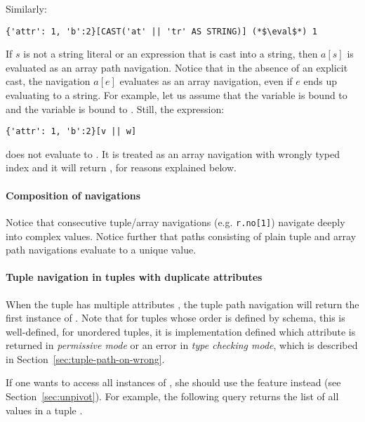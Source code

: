 \noindent Similarly:

\begin{lstlisting}
{'attr': 1, 'b':2}[CAST('at' || 'tr' AS STRING)] (*$\eval$*) 1
\end{lstlisting}

If $s$ is not a string literal or an expression that is cast into a string, then
$a[s]$ is evaluated as an array path navigation. Notice that in the absence of
an explicit cast, the navigation $a[e]$ evaluates as an array navigation, even
if $e$ ends up evaluating to a string. For example, let us assume that the
variable  is bound to  and the variable  is bound to
. Still, the expression:


\begin{lstlisting}
{'attr': 1, 'b':2}[v || w]
\end{lstlisting}

\noindent does not evaluate to . It is treated as an array navigation with
wrongly typed index and it will return , for reasons explained
below. 

\paragraph{Composition of navigations} Notice that consecutive
tuple/array navigations (e.g. \texttt{r.no[1]}) navigate deeply into complex
values. Notice further that paths consisting of plain tuple and array path
navigations evaluate to a unique value.


\paragraph{Tuple navigation in tuples with duplicate attributes} When the tuple
 has multiple attributes , the tuple path navigation  will
return the first instance of .  Note that for tuples whose order is
defined by schema, this is well-defined, for unordered tuples, it is
implementation defined which attribute is returned in \textit{permissive mode}
or an error in \textit{type checking mode}, which is described in
Section~\ref{sec:tuple-path-on-wrong}.

If one wants to access all instances of , she should use the 
feature instead (see Section~\ref{sec:unpivot}). For example, the
following query returns the list of all  values in a tuple .

